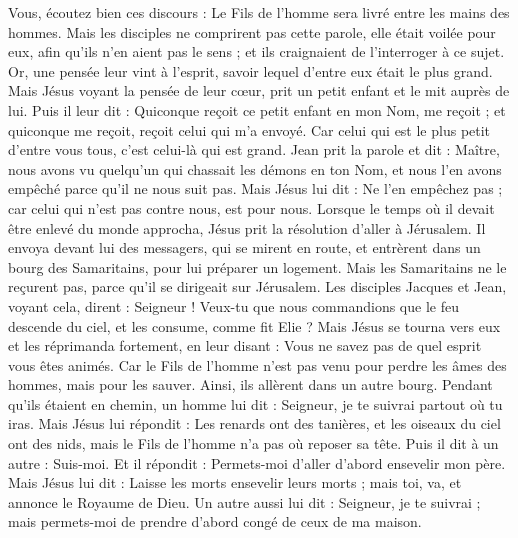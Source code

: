 \begin{multicols}{2}
Vous, écoutez bien ces discours : Le Fils de l'homme sera livré entre les mains des hommes.
Mais les disciples ne comprirent pas cette parole, elle était voilée pour eux, afin qu’ils n’en aient pas le sens ; et ils craignaient de l'interroger à ce sujet.
Or, une pensée leur vint à l’esprit, savoir lequel d'entre eux était le plus grand.
Mais Jésus voyant la pensée de leur cœur, prit un petit enfant et le mit auprès de lui.
Puis il leur dit : Quiconque reçoit ce petit enfant en mon Nom, me reçoit ; et quiconque me reçoit, reçoit celui qui m'a envoyé. Car celui qui est le plus petit d'entre vous tous, c'est celui-là qui est grand.
Jean prit la parole et dit : Maître, nous avons vu quelqu'un qui chassait les démons en ton Nom, et nous l'en avons empêché parce qu'il ne nous suit pas.
Mais Jésus lui dit : Ne l'en empêchez pas ; car celui qui n'est pas contre nous, est pour nous.
Lorsque le temps où il devait être enlevé du monde approcha, Jésus prit la résolution d'aller à Jérusalem.
Il envoya devant lui des messagers, qui se mirent en route, et entrèrent dans un bourg des Samaritains, pour lui préparer un logement.
Mais les Samaritains ne le reçurent pas, parce qu'il se dirigeait sur Jérusalem.
Les disciples Jacques et Jean, voyant cela, dirent : Seigneur ! Veux-tu que nous commandions que le feu descende du ciel, et les consume, comme fit Elie ?
Mais Jésus se tourna vers eux et les réprimanda fortement, en leur disant : Vous ne savez pas de quel esprit vous êtes animés.
Car le Fils de l'homme n'est pas venu pour perdre les âmes des hommes, mais pour les sauver. Ainsi, ils allèrent dans un autre bourg.
Pendant qu’ils étaient en chemin, un homme lui dit : Seigneur, je te suivrai partout où tu iras.
Mais Jésus lui répondit : Les renards ont des tanières, et les oiseaux du ciel ont des nids, mais le Fils de l'homme n'a pas où reposer sa tête.
Puis il dit à un autre : Suis-moi. Et il répondit : Permets-moi d'aller d’abord ensevelir mon père.
Mais Jésus lui dit : Laisse les morts ensevelir leurs morts ; mais toi, va, et annonce le Royaume de Dieu.
Un autre aussi lui dit : Seigneur, je te suivrai ; mais permets-moi de prendre d’abord congé de ceux de ma maison.

\end{multicols}
